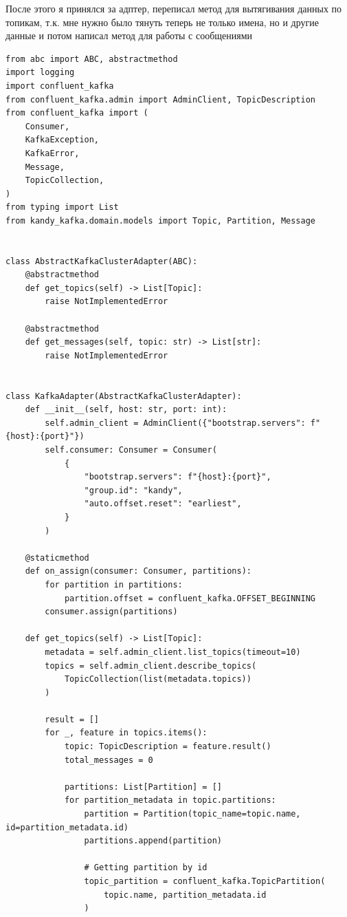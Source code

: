 \documentclass[10pt , a4paper]{report}
\newenvironment{code}{\captionsetup{type=listing}}{}
\begin{document}
После этого я принялся за адптер, переписал метод для вытягивания данных по топикам, т.к. мне нужно было тянуть теперь не только имена, но и другие данные и потом написал метод для работы с сообщениями

\begin{code}
  \begin{verbatim}
from abc import ABC, abstractmethod
import logging
import confluent_kafka
from confluent_kafka.admin import AdminClient, TopicDescription
from confluent_kafka import (
    Consumer,
    KafkaException,
    KafkaError,
    Message,
    TopicCollection,
)
from typing import List
from kandy_kafka.domain.models import Topic, Partition, Message


class AbstractKafkaClusterAdapter(ABC):
    @abstractmethod
    def get_topics(self) -> List[Topic]:
        raise NotImplementedError

    @abstractmethod
    def get_messages(self, topic: str) -> List[str]:
        raise NotImplementedError


class KafkaAdapter(AbstractKafkaClusterAdapter):
    def __init__(self, host: str, port: int):
        self.admin_client = AdminClient({"bootstrap.servers": f"{host}:{port}"})
        self.consumer: Consumer = Consumer(
            {
                "bootstrap.servers": f"{host}:{port}",
                "group.id": "kandy",
                "auto.offset.reset": "earliest",
            }
        )

    @staticmethod
    def on_assign(consumer: Consumer, partitions):
        for partition in partitions:
            partition.offset = confluent_kafka.OFFSET_BEGINNING
        consumer.assign(partitions)

    def get_topics(self) -> List[Topic]:
        metadata = self.admin_client.list_topics(timeout=10)
        topics = self.admin_client.describe_topics(
            TopicCollection(list(metadata.topics))
        )

        result = []
        for _, feature in topics.items():
            topic: TopicDescription = feature.result()
            total_messages = 0

            partitions: List[Partition] = []
            for partition_metadata in topic.partitions:
                partition = Partition(topic_name=topic.name, id=partition_metadata.id)
                partitions.append(partition)

                # Getting partition by id
                topic_partition = confluent_kafka.TopicPartition(
                    topic.name, partition_metadata.id
                )


\end{verbatim}
\end{code}
\end{document}
